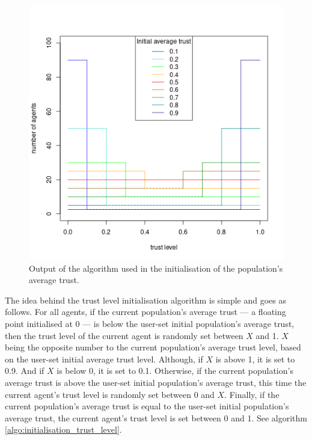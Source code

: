 \begin{figure}[!htb]
    \centering
        \includegraphics[width=\linewidth]{pics/initial_average_trust.png}
        \caption{Output of the algorithm used in the initialisation of the population's average trust.}
        \label{fig:initial_average_trust}
    \endminipage{}
\end{figure}

\pagebreak

The idea behind the trust level initialisation algorithm is simple and goes as follows. For all agents, if the current population's average trust --- a floating point initialised at 0 --- is below the user-set initial population's average trust, then the trust level of the current agent is randomly set between $X$ and 1. $X$ being the opposite number to the current population's average trust level, based on the user-set initial average trust level. Although, if $X$ is above 1, it is set to 0.9. And if $X$ is below 0, it is set to 0.1. Otherwise, if the current population's average trust is above the user-set initial population's average trust, this time the current agent's trust level is randomly set between 0 and $X$. Finally, if the current population's average trust is equal to the user-set initial population's average trust, the current agent's trust level is set between 0 and 1. See algorithm \ref{algo:initialisation_trust_level}.


